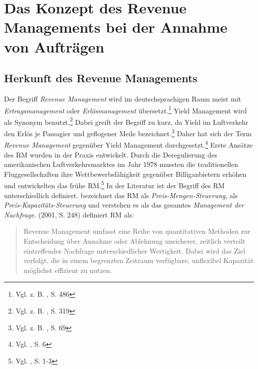 \chapter{Das Konzept des Revenue Managements bei der Annahme von Aufträgen}
\setcounter{footnote}{4}  %


\section{Herkunft des Revenue Managements}
Der Begriff \textit{Revenue Management} wird im deutschsprachigen Raum meist mit \textit{Ertrags}\-\textit{management} oder \textit{Erlösmanagement} übersetzt.\footnote{Vgl. z. B. \cite{zehle1991yield}, S. 486} Yield Management wird als Synonym benutzt.\footnote{Vgl. z. B. \cite{kolisch2006revenue}, S. 319} Dabei greift der Begriff zu kurz, da  Yield im Luftverkehr den Erlös je Passagier und geflogener Meile bezeichnet.\footnote{Vgl. z. B. \cite{weatherford1998tutorial}, S. 69} Daher hat sich der Term \textit{Revenue Management} gegenüber Yield Management durchgesetzt.\footnote{Vgl. \cite{Klein:2008aa}, S. 6} Erste Ansätze des RM wurden in der Praxis entwickelt. Durch die Deregulierung des amerikanischen Luftverkehrsmarktes im Jahr 1978 mussten die traditionellen Fluggesellschaften ihre Wettbewerbsfähigkeit gegenüber Billiganbietern erhöhen und entwickelten das frühe RM.\footnote{Vgl. \cite{Petrick:2009aa}, S. 1-3} In der Literatur ist der Begriff des RM unterschiedlich definiert. \cite{friege1996yield} bezeichnet das RM als \textit{Preis-Mengen-Steuerung}, \cite{daudel1992yield} als \textit{Preis-Kapazitäts-Steuerung} und \cite{talluri2004theory} verstehen es als das gesamtes \textit{Management der Nachfrage}. \citeauthor{klein2001revenue} (2001, S. 248) definiert RM als:

\begin{quote}
\glqq Revenue Management umfasst eine Reihe von quantitativen Methoden zur Entscheidung über Annahme oder Ablehnung unsicherer, zeitlich verteilt eintreffender Nachfrage unterschiedlicher Wertigkeit. Dabei wird das Ziel verfolgt, die in einem begrenzten Zeitraum verfügbare, unflexibel Kapazität möglichst effizient zu nutzen.\grqq
\end{quote}

